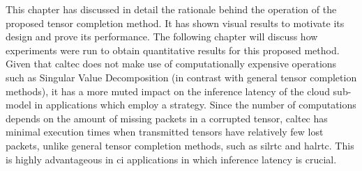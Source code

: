 This chapter has discussed in detail the rationale behind the operation of the proposed tensor completion method. It has shown visual results to motivate its design and prove its performance. The following chapter will discuss how experiments were run to obtain quantitative results for this proposed method. Given that \gls{caltec} does not make use of computationally expensive operations such as Singular Value Decomposition (in contrast with general tensor completion methods), it has a more muted impact on the inference latency of the cloud sub-model in applications which employ a  strategy. Since the number of computations depends on the amount of missing packets in a corrupted tensor, \gls{caltec} has minimal execution times when transmitted tensors have relatively few lost packets, unlike general tensor completion methods, such as \gls{silrtc} and \gls{halrtc}. This is highly advantageous in \gls{ci} applications in which inference latency is crucial.